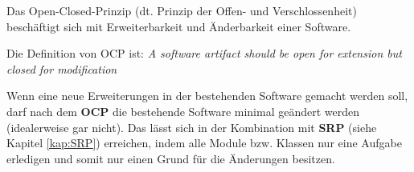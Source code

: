 Das Open-Closed-Prinzip (dt. Prinzip der Offen- und Verschlossenheit) beschäftigt sich 
mit Erweiterbarkeit und Änderbarkeit einer Software.

Die Definition von OCP ist:
\textit{A software artifact should be open for extension but 
closed for modification}\cite[70]{cleanArchitecture}

Wenn eine neue Erweiterungen in der bestehenden Software gemacht werden soll, 
darf nach dem \textbf{OCP} die bestehende Software minimal geändert werden 
(idealerweise gar nicht). Das lässt sich in der Kombination mit \textbf{SRP} (siehe Kapitel \ref{kap:SRP})
erreichen, indem alle Module bzw. Klassen nur eine Aufgabe erledigen und somit 
nur einen Grund für die Änderungen besitzen.
